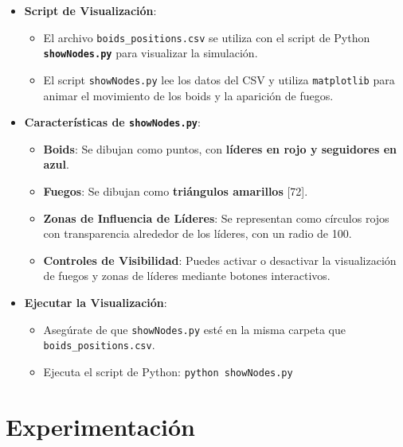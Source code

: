 \documentclass{article}
\begin{document}
\begin{itemize}
    \item \textbf{Script de Visualización}:
    \begin{itemize}
        \item El archivo \texttt{boids\_positions.csv} se utiliza con el script de Python \textbf{\texttt{showNodes.py}} para visualizar la simulación.
        \item El script \texttt{showNodes.py} lee los datos del CSV y utiliza \texttt{matplotlib} para animar el movimiento de los boids y la aparición de fuegos.
    \end{itemize}
    \item \textbf{Características de \texttt{showNodes.py}}:
    \begin{itemize}
        \item \textbf{Boids}: Se dibujan como puntos, con \textbf{líderes en rojo y seguidores en azul}.
        \item \textbf{Fuegos}: Se dibujan como \textbf{triángulos amarillos} [72].
        \item \textbf{Zonas de Influencia de Líderes}: Se representan como círculos rojos con transparencia alrededor de los líderes, con un radio de 100.
        \item \textbf{Controles de Visibilidad}: Puedes activar o desactivar la visualización de fuegos y zonas de líderes mediante botones interactivos.
    \end{itemize}
    \item \textbf{Ejecutar la Visualización}:
    \begin{itemize}
        \item Asegúrate de que \texttt{showNodes.py} esté en la misma carpeta que \texttt{boids\_positions.csv}.
        \item Ejecuta el script de Python: \texttt{python showNodes.py}
    \end{itemize}
\end{itemize}


\section{Experimentación}\label{sec:exp}
\end{document}
